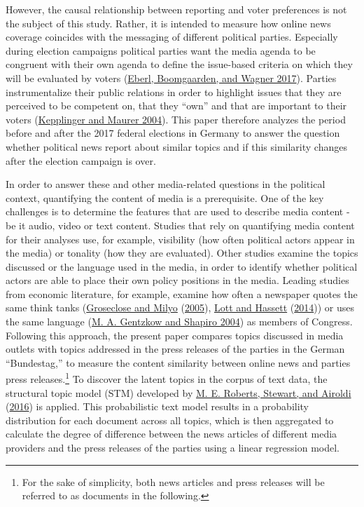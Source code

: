 \documentclass[
]{article}
\begin{document}
However, the causal relationship between reporting and voter preferences
is not the subject of this study. Rather, it is intended to measure how
online news coverage coincides with the messaging of different political
parties. Especially during election campaigns political parties want the
media agenda to be congruent with their own agenda to define the
issue-based criteria on which they will be evaluated by voters
(\protect\hyperlink{ref-eberl_one_2017}{Eberl, Boomgaarden, and Wagner
2017}). Parties instrumentalize their public relations in order to
highlight issues that they are perceived to be competent on, that they
``own'' and that are important to their voters
(\protect\hyperlink{ref-kepplinger_einfluss_2004}{Kepplinger and Maurer
2004}). This paper therefore analyzes the period before and after the
2017 federal elections in Germany to answer the question whether
political news report about similar topics and if this similarity
changes after the election campaign is over.

In order to answer these and other media-related questions in the
political context, quantifying the content of media is a prerequisite.
One of the key challenges is to determine the features that are used to
describe media content - be it audio, video or text content. Studies
that rely on quantifying media content for their analyses use, for
example, visibility (how often political actors appear in the media) or
tonality (how they are evaluated). Other studies examine the topics
discussed or the language used in the media, in order to identify
whether political actors are able to place their own policy positions in
the media. Leading studies from economic literature, for example,
examine how often a newspaper quotes the same think tanks
(\protect\hyperlink{ref-groseclose_measure_2005}{Groseclose and Milyo}
(\protect\hyperlink{ref-groseclose_measure_2005}{2005}),
\protect\hyperlink{ref-lott_is_2014}{Lott and Hassett}
(\protect\hyperlink{ref-lott_is_2014}{2014})) or uses the same language
(\protect\hyperlink{ref-gentzkow_media_2004}{M. A. Gentzkow and Shapiro
2004}) as members of Congress. Following this approach, the present
paper compares topics discussed in media outlets with topics addressed
in the press releases of the parties in the German ``Bundestag,'' to
measure the content similarity between online news and parties press
releases.\footnote{For the sake of simplicity, both news articles and
  press releases will be referred to as documents in the following.} To
discover the latent topics in the corpus of text data, the structural
topic model (STM) developed by
\protect\hyperlink{ref-roberts_model_2016}{M. E. Roberts, Stewart, and
Airoldi} (\protect\hyperlink{ref-roberts_model_2016}{2016}) is applied.
This probabilistic text model results in a probability distribution for
each document across all topics, which is then aggregated to calculate
the degree of difference between the news articles of different media
providers and the press releases of the parties using a linear
regression model.
\end{document}
